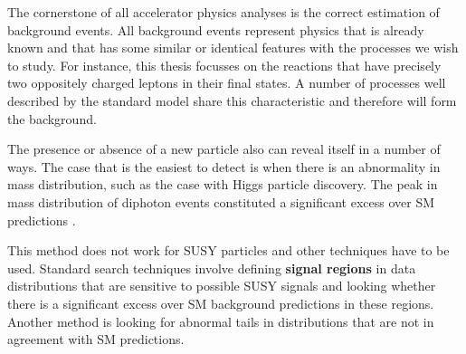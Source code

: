 The cornerstone of all accelerator physics analyses is the correct estimation of background events. All background events represent physics that is already known and that has some similar or identical features with the processes we wish to study. For instance, this thesis focusses on the  reactions that have precisely two oppositely charged leptons in their final states. A number of processes well described by the standard model share this characteristic and therefore will form the background. 

The presence or absence of a new particle also can reveal itself in a number of ways. The case that is the easiest to detect is when there is an abnormality in mass distribution, such as the case with Higgs particle discovery. The peak in mass distribution of diphoton events constituted a significant excess over SM predictions \citep{chatrchyan2012observation,Aad:2012tfa}. 

This method does not work for SUSY particles and other techniques have to be used. Standard search techniques involve defining \textbf{signal regions} in data distributions that are sensitive to possible SUSY signals and looking whether there is a significant excess over SM background predictions in these regions. Another method is looking for abnormal tails in distributions that are not in agreement with SM predictions.   


